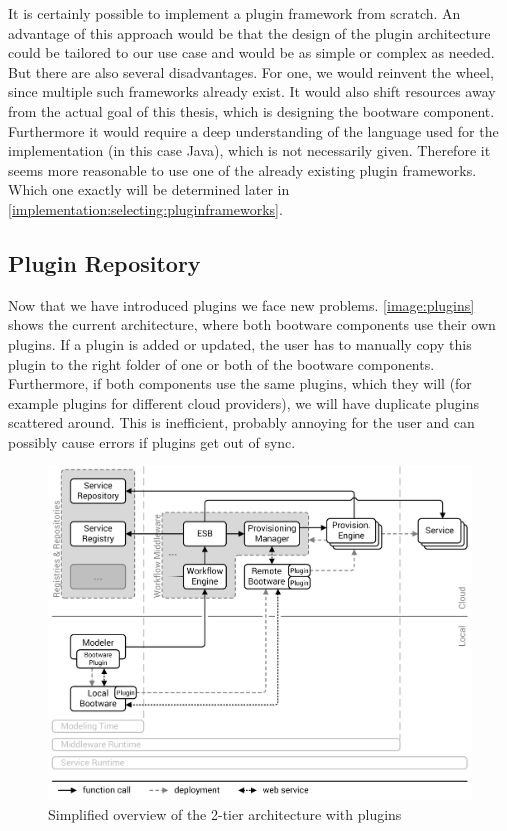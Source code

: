 It is certainly possible to implement a plugin framework from scratch.
An advantage of this approach would be that the design of the plugin architecture could be tailored to our use case and would be as simple or complex as needed.
But there are also several disadvantages.
For one, we would reinvent the wheel, since multiple such frameworks already exist.
It would also shift resources away from the actual goal of this thesis, which is designing the bootware component.
Furthermore it would require a deep understanding of the language used for the implementation (in this case Java), which is not necessarily given.
Therefore it seems more reasonable to use one of the already existing plugin frameworks.
Which one exactly will be determined later in \autoref{implementation:selecting:pluginframeworks}.

\subsection{Plugin Repository}

Now that we have introduced plugins we face new problems.
\autoref{image:plugins} shows the current architecture, where both bootware components use their own plugins.
If a plugin is added or updated, the user has to manually copy this plugin to the right folder of one or both of the bootware components.
Furthermore, if both components use the same plugins, which they will (for example plugins for different cloud providers), we will have duplicate plugins scattered around.
This is inefficient, probably annoying for the user and can possibly cause errors if plugins get out of sync.

\begin{figure}[!htbp]
	\centering
	\includegraphics[resolution=600]{design/assets/plugins}
	\caption{Simplified overview of the 2-tier architecture with plugins}
	\label{image:plugins}
\end{figure}

